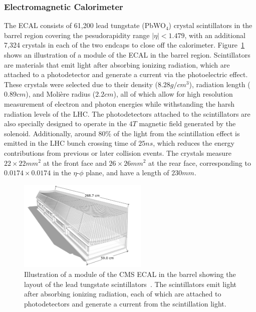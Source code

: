 \subsubsection{Electromagnetic Calorimeter}

The ECAL consists of 61,200 lead tungstate (PbWO$_4$) crystal scintillators in the barrel region covering the pesudorapidity range $|\eta|<1.479$, with an additional 7,324 crystals in each of the two endcaps to close off the calorimeter.
Figure~\ref{fig:CMSECAL} shows an illustration of a module of the ECAL in the barrel region.
Scintillators are materials that emit light after absorbing ionizing radiation, which are attached to a photodetector and generate a current via the photoelectric effect.
These crystals were selected due to their density ($8.28\unit{g/cm^3}$), radiation length ($0.89\unit{cm}$), and Moli\`{e}re radius ($2.2\unit{cm}$), all of which allow for high resolution measurement of electron and photon energies while withstanding the harsh radiation levels of the LHC.
The photodetectors attached to the scintillators are also specially designed to operate in the $4\unit{T}$ magnetic field generated by the solenoid.
Additionally, around 80\% of the light from the scintillation effect is emitted in the LHC bunch crossing time of $25\unit{ns}$, which reduces the energy contributions from previous or later collision events.
The crystals measure $22\times22\unit{mm^2}$ at the front face and $26\times26\unit{mm^2}$ at the rear face, corresponding to $0.0174\times0.0174$ in the $\eta$-$\phi$ plane, and have a length of $230\unit{mm}$.

\begin{figure}[htbp]
  \centering
  \includegraphics[width=0.55\textwidth]{fig/experiment/20130816_01_EB_module_1.pdf}
  \caption[
    Illustration of a module of the CMS ECAL in the barrel showing the layout of the lead tungstate scintillators.
    The scintillators emit light after absorbing ionizing radiation, each of which are attached to photodetectors and generate a current from the scintillation light.
  ]{
    Illustration of a module of the CMS ECAL in the barrel showing the layout of the lead tungstate scintillators~\cite{Sakuma_2014}.
    The scintillators emit light after absorbing ionizing radiation, each of which are attached to photodetectors and generate a current from the scintillation light.
  }
  \label{fig:CMSECAL}
\end{figure}

